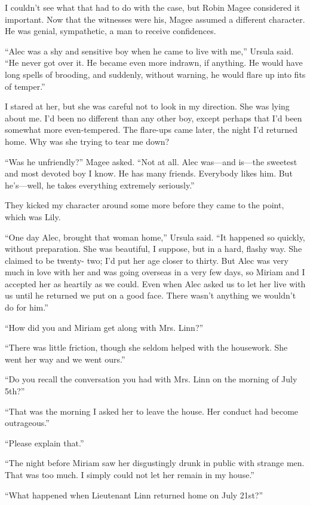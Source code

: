 \documentclass{novel}
\begin{document}
I couldn’t see what that had to do with the case, but Robin Magee considered it important. Now that the witnesses were his, Magee assumed a different character. He was genial, sympathetic, a man to receive confidences.

“Alec was a shy and sensitive boy when he came to live with me,” Ursula said. “He never got over it. He became even more indrawn, if anything. He would have long spells of brooding, and suddenly, without warning, he would flare up into fits of temper.”

I stared at her, but she was careful not to look in my direction. She was lying about me. I’d been no different than any other boy, except perhaps that I’d been somewhat more even-tempered. The flare-ups came later, the night I’d returned home. Why was she trying to tear me down?

“Was he unfriendly?” Magee asked. “Not at all. Alec was—and is—the sweetest and most devoted boy I know. He has many friends. Everybody likes him. But he’s—well, he takes everything extremely seriously.”

They kicked my character around some more before they came to the point, which was Lily.

“One day Alec, brought that woman home,” Ursula said. “It happened so quickly, without preparation. She was beautiful, I suppose, but in a hard, flashy way. She claimed to be twenty- two; I’d put her age closer to thirty. But Alec was very much in love with her and was going overseas in a very few days, so Miriam and I accepted her as heartily as we could. Even when Alec asked us to let her live with us until he returned we put on a good face. There wasn’t anything we wouldn’t do for him.”

“How did you and Miriam get along with Mrs. Linn?”

“There was little friction, though she seldom helped with the housework. She went her way and we went ours.”

“Do you recall the conversation you had with Mrs. Linn on the morning of July 5th?”

“That was the morning I asked her to leave the house. Her conduct had become outrageous.”

“Please explain that.”

“The night before Miriam saw her disgustingly drunk in public with strange men. That was too much. I simply could not let her remain in my house.”

“What happened when Lieutenant Linn returned home on July 21st?”
\end{document}
